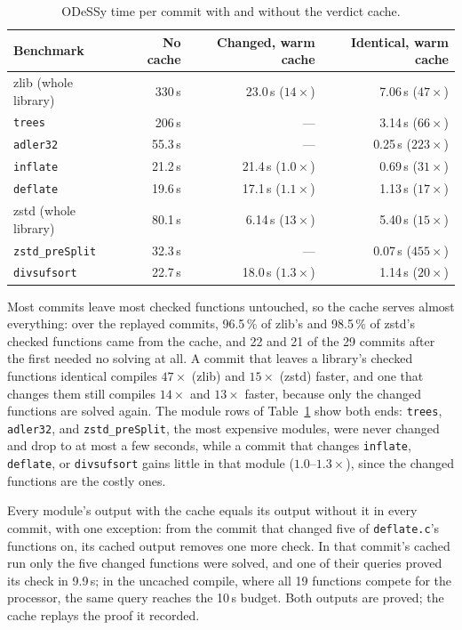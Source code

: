 \documentclass[acmsmall,screen,nonacm]{acmart}
\newcommand{\odessy}{ODeSSy}
\newcommand{\tool}{\odessy}
\begin{document}
\begin{table}[h]
\centering\small
\caption{\tool{} time per commit with and without the verdict cache.}
\label{tab:cache-replay}
\begin{tabular}{lrrr}
\toprule
Benchmark & No cache & Changed, warm cache & Identical, warm cache\\
\midrule
zlib (whole library) & 330\,s & 23.0\,s ($14\times$) & 7.06\,s ($47\times$)\\
\quad \texttt{trees} & 206\,s & --- & 3.14\,s ($66\times$)\\
\quad \texttt{adler32} & 55.3\,s & --- & 0.25\,s ($223\times$)\\
\quad \texttt{inflate} & 21.2\,s & 21.4\,s ($1.0\times$) & 0.69\,s ($31\times$)\\
\quad \texttt{deflate} & 19.6\,s & 17.1\,s ($1.1\times$) & 1.13\,s ($17\times$)\\
zstd (whole library) & 80.1\,s & 6.14\,s ($13\times$) & 5.40\,s ($15\times$)\\
\quad \texttt{zstd\_preSplit} & 32.3\,s & --- & 0.07\,s ($455\times$)\\
\quad \texttt{divsufsort} & 22.7\,s & 18.0\,s ($1.3\times$) & 1.14\,s ($20\times$)\\
\bottomrule
\end{tabular}
\end{table}

Most commits leave most checked functions untouched, so the cache serves
almost everything: over the replayed commits, 96.5\,\% of zlib's and
98.5\,\% of zstd's checked functions came from the cache, and 22 and 21 of
the 29 commits after the first needed no solving at all. A commit that
leaves a library's checked functions identical compiles $47\times$ (zlib)
and $15\times$ (zstd) faster, and one that changes them still compiles
$14\times$ and $13\times$ faster, because only the changed functions are
solved again. The module rows of Table~\ref{tab:cache-replay} show both
ends: \texttt{trees}, \texttt{adler32}, and \texttt{zstd\_preSplit}, the
most expensive modules, were never changed and drop to at most a few
seconds, while a commit that changes \texttt{inflate},
\texttt{deflate}, or \texttt{divsufsort} gains little in that module
($1.0$--$1.3\times$), since the changed functions are the costly ones.

Every module's output with the cache equals its output without it in every
commit, with one exception: from the commit that changed five of
\texttt{deflate.c}'s functions on, its cached output removes one more check.
In that commit's cached run only the five changed functions were solved,
and one of their queries proved its check in 9.9\,s; in the uncached
compile, where all 19 functions compete for the processor, the same query
reaches the 10\,s budget. Both outputs are proved; the cache replays the
proof it recorded.
\end{document}
